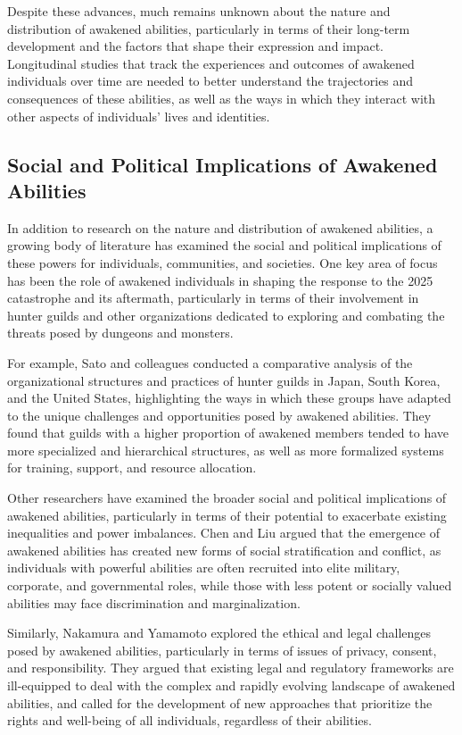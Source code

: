 \documentclass[12pt]{article}
\begin{document}
Despite these advances, much remains unknown about the nature and distribution of awakened abilities, particularly in terms of their long-term development and the factors that shape their expression and impact. Longitudinal studies that track the experiences and outcomes of awakened individuals over time are needed to better understand the trajectories and consequences of these abilities, as well as the ways in which they interact with other aspects of individuals' lives and identities.

\subsection{Social and Political Implications of Awakened Abilities}
In addition to research on the nature and distribution of awakened abilities, a growing body of literature has examined the social and political implications of these powers for individuals, communities, and societies. One key area of focus has been the role of awakened individuals in shaping the response to the 2025 catastrophe and its aftermath, particularly in terms of their involvement in hunter guilds and other organizations dedicated to exploring and combating the threats posed by dungeons and monsters.

For example, Sato and colleagues \cite{Sato2026} conducted a comparative analysis of the organizational structures and practices of hunter guilds in Japan, South Korea, and the United States, highlighting the ways in which these groups have adapted to the unique challenges and opportunities posed by awakened abilities. They found that guilds with a higher proportion of awakened members tended to have more specialized and hierarchical structures, as well as more formalized systems for training, support, and resource allocation.

Other researchers have examined the broader social and political implications of awakened abilities, particularly in terms of their potential to exacerbate existing inequalities and power imbalances. Chen and Liu \cite{Chen2026} argued that the emergence of awakened abilities has created new forms of social stratification and conflict, as individuals with powerful abilities are often recruited into elite military, corporate, and governmental roles, while those with less potent or socially valued abilities may face discrimination and marginalization.

Similarly, Nakamura and Yamamoto \cite{Nakamura2026b} explored the ethical and legal challenges posed by awakened abilities, particularly in terms of issues of privacy, consent, and responsibility. They argued that existing legal and regulatory frameworks are ill-equipped to deal with the complex and rapidly evolving landscape of awakened abilities, and called for the development of new approaches that prioritize the rights and well-being of all individuals, regardless of their abilities.
\end{document}
